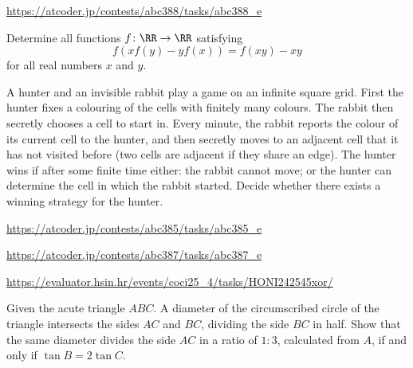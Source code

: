 \documentclass[11pt]{scrartcl}
\begin{document}
\begin{problem}[AC ABC388E]
\url{https://atcoder.jp/contests/abc388/tasks/abc388_e}
\end{problem}
\begin{problem}
  Determine all functions $f \colon \RR \to \RR$ satisfying
  \[ f\left( xf(y)-yf(x) \right) = f(xy)-xy \]
  for all real numbers $x$ and $y$.

\end{problem}
\begin{problem}
	A hunter and an invisible rabbit play a game on an infinite square grid. First the hunter fixes a colouring of the cells with finitely many colours. The rabbit then secretly chooses a cell to start in. Every minute, the rabbit reports the colour of its current cell to the hunter, and then secretly moves to an adjacent cell that it has not visited before (two cells are adjacent if they share an edge). The hunter wins if after some finite time either:
the rabbit cannot move; or
the hunter can determine the cell in which the rabbit started.
Decide whether there exists a winning strategy for the hunter.
\end{problem}
\begin{problem}[AC ABC385E]
\url{https://atcoder.jp/contests/abc385/tasks/abc385_e}
\end{problem}
\begin{problem}[AC ABC387E]
\url{https://atcoder.jp/contests/abc387/tasks/abc387_e}
\end{problem}
\begin{problem}[COCI 2024/R4.C]
\url{https://evaluator.hsin.hr/events/coci25_4/tasks/HONI242545xor/}
\end{problem}
\begin{problem}[Swedish 2015/1]
Given the acute triangle $ABC$. A diameter of the circumscribed circle of the triangle intersects the sides $AC$ and $BC$, dividing the side $BC$ in half. Show that the same diameter divides the side $AC$ in a ratio of $1: 3$, calculated from $A$, if and only if $\tan B = 2 \tan C$.
\end{problem}
\end{document}
